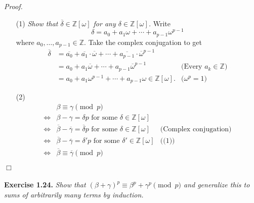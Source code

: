 \documentclass{article}
\begin{document}
\emph{Proof.}
\begin{enumerate}
\item[(1)]
\emph{Show that $\overline{\delta} \in \mathbb{Z}[\omega]$ for any
$\delta \in \mathbb{Z}[\omega]$. }
Write $$\delta = a_0 + a_1 \omega + \cdots + a_{p-1} \omega^{p-1}$$
where $a_0, \ldots, a_{p-1} \in \mathbb{Z}$.
Take the complex conjugation to get
\begin{align*}
\overline{\delta}
&= \overline{a_0} + \overline{a_1} \cdot \overline{\omega} + \cdots
  + \overline{a_{p-1}} \cdot \overline{\omega}^{p-1} \\
&= a_0 + a_1 \overline{\omega} + \cdots + a_{p-1} \overline{\omega}^{p-1}
  &\text{(Every $a_k \in \mathbb{Z}$)} \\
&= a_0 + a_1 \omega^{p-1} + \cdots + a_{p-1} \omega \in \mathbb{Z}[\omega].
  &\text{($\omega^p = 1$)}
\end{align*}
\item[(2)]
\begin{align*}
&\beta \equiv \gamma \pmod{p} \\
\Longleftrightarrow&
\beta - \gamma = \delta p \text{ for some } \delta \in \mathbb{Z}[\omega] \\
\Longleftrightarrow&
\overline{\beta} - \overline{\gamma}
= \overline{\delta} p \text{ for some } \delta \in \mathbb{Z}[\omega]
  &\text{(Complex conjugation)} \\
\Longleftrightarrow&
\overline{\beta} - \overline{\gamma}
= \delta' p \text{ for some } \delta' \in \mathbb{Z}[\omega]
  &\text{((1))} \\
\Longleftrightarrow&
\overline{\beta} \equiv \overline{\gamma} \pmod{p}
\end{align*}
\end{enumerate}
$\Box$ \\\\






\textbf{Exercise 1.24.}
\emph{Show that
$(\beta+\gamma)^p \equiv \beta^p + \gamma^p \pmod{p}$
and generalize this to sums of arbitrarily many terms by induction. } \\
\end{document}
